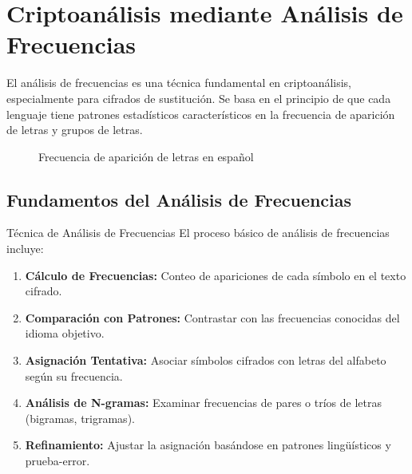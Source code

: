 \section{Criptoanálisis mediante Análisis de Frecuencias}

El análisis de frecuencias es una técnica fundamental en criptoanálisis, especialmente para cifrados de sustitución. Se basa en el principio de que cada lenguaje tiene patrones estadísticos característicos en la frecuencia de aparición de letras y grupos de letras.

\begin{figure}[ht]
	\centering
	\caption{Frecuencia de aparición de letras en español}
	\label{fig:frecuencias-espanol}
\end{figure}

\subsection{Fundamentos del Análisis de Frecuencias}

\begin{cryptomethod}{Técnica de Análisis de Frecuencias}
	El proceso básico de análisis de frecuencias incluye:

	\begin{enumerate}
		\item \textbf{Cálculo de Frecuencias:} Conteo de apariciones de cada símbolo en el texto cifrado.

		\item \textbf{Comparación con Patrones:} Contrastar con las frecuencias conocidas del idioma objetivo.

		\item \textbf{Asignación Tentativa:} Asociar símbolos cifrados con letras del alfabeto según su frecuencia.

		\item \textbf{Análisis de N-gramas:} Examinar frecuencias de pares o tríos de letras (bigramas, trigramas).

		\item \textbf{Refinamiento:} Ajustar la asignación basándose en patrones lingüísticos y prueba-error.
	\end{enumerate}
\end{cryptomethod}

